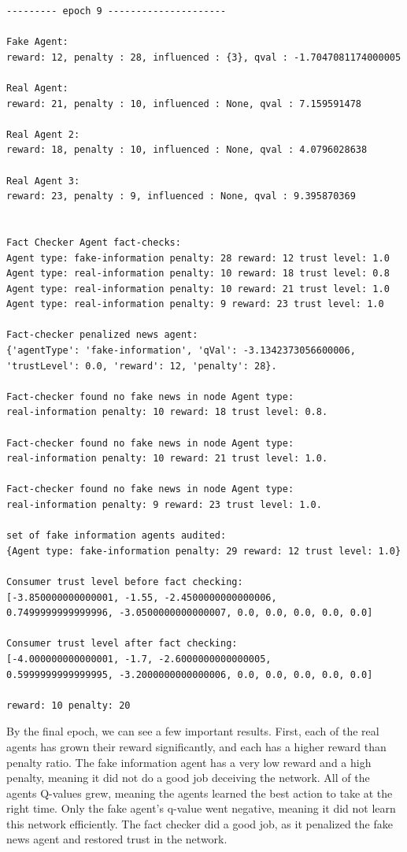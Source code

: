 \documentclass[twoside]{article}
\begin{document}
\begin{verbatim}
--------- epoch 9 ---------------------

Fake Agent: 
reward: 12, penalty : 28, influenced : {3}, qval : -1.7047081174000005

Real Agent: 
reward: 21, penalty : 10, influenced : None, qval : 7.159591478

Real Agent 2: 
reward: 18, penalty : 10, influenced : None, qval : 4.0796028638

Real Agent 3: 
reward: 23, penalty : 9, influenced : None, qval : 9.395870369


Fact Checker Agent fact-checks: 
Agent type: fake-information penalty: 28 reward: 12 trust level: 1.0
Agent type: real-information penalty: 10 reward: 18 trust level: 0.8
Agent type: real-information penalty: 10 reward: 21 trust level: 1.0
Agent type: real-information penalty: 9 reward: 23 trust level: 1.0

Fact-checker penalized news agent: 
{'agentType': 'fake-information', 'qVal': -3.1342373056600006, 
'trustLevel': 0.0, 'reward': 12, 'penalty': 28}.

Fact-checker found no fake news in node Agent type: 
real-information penalty: 10 reward: 18 trust level: 0.8.

Fact-checker found no fake news in node Agent type: 
real-information penalty: 10 reward: 21 trust level: 1.0.

Fact-checker found no fake news in node Agent type: 
real-information penalty: 9 reward: 23 trust level: 1.0.

set of fake information agents audited:  
{Agent type: fake-information penalty: 29 reward: 12 trust level: 1.0}

Consumer trust level before fact checking:  
[-3.850000000000001, -1.55, -2.4500000000000006, 
0.7499999999999996, -3.0500000000000007, 0.0, 0.0, 0.0, 0.0, 0.0]

Consumer trust level after fact checking: 
[-4.000000000000001, -1.7, -2.6000000000000005, 
0.5999999999999995, -3.2000000000000006, 0.0, 0.0, 0.0, 0.0, 0.0]

reward: 10 penalty: 20
\end{verbatim}

By the final epoch, we can see a few important results. First, each of the real agents has grown their reward significantly, and each has a higher reward than penalty ratio. The fake information agent has a very low reward and a high penalty, meaning it did not do a good job deceiving the network. All of the agents Q-values grew, meaning the agents learned the best action to take at the right time. Only the fake agent's q-value went negative, meaning it did not learn this network efficiently. The fact checker did a good job, as it penalized the fake news agent and restored trust in the network.
\end{document}
